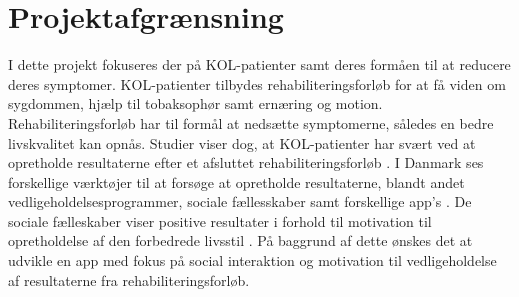 \newpage

\section{Projektafgrænsning}
I dette projekt fokuseres der på KOL-patienter samt deres formåen til at reducere deres symptomer. KOL-patienter tilbydes rehabiliteringsforløb for at få viden om sygdommen, hjælp til tobaksophør samt ernæring og motion. Rehabiliteringsforløb har til formål at nedsætte symptomerne, således en bedre livskvalitet kan opnås.\cite{Lungeforeningen2016,McCarthy2015,Habraken2011,Sundhedsstyrelsen2015} Studier viser dog, at KOL-patienter har svært ved at opretholde resultaterne efter et afsluttet rehabiliteringsforløb \cite{Egan2012,Beachamp2013,Zanaboni2017,Ringbaek2008}. I Danmark ses forskellige værktøjer til at forsøge at opretholde resultaterne, blandt andet vedligeholdelsesprogrammer, sociale fællesskaber samt forskellige app's \cite{Sundhedsstyrelsen2015,HealthcareDenmark2017}. De sociale fælleskaber viser positive resultater i forhold til motivation til opretholdelse af den forbedrede livsstil \cite{dsam2016}.
På baggrund af dette ønskes det at udvikle en app med fokus på social interaktion og motivation til vedligeholdelse af resultaterne fra rehabiliteringsforløb. 
